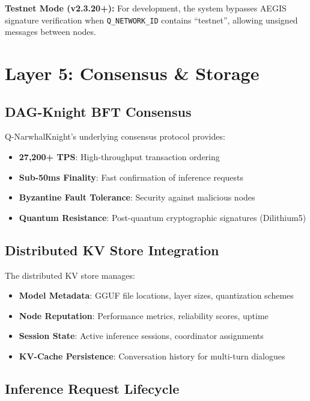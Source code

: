 \documentclass[11pt,a4paper]{article}
\begin{document}
\textbf{Testnet Mode (v2.3.20+):} For development, the system bypasses AEGIS signature verification when \texttt{Q\_NETWORK\_ID} contains ``testnet'', allowing unsigned messages between nodes.

\newpage
\section{Layer 5: Consensus \& Storage}

\subsection{DAG-Knight BFT Consensus}

Q-NarwhalKnight's underlying consensus protocol provides:
\begin{itemize}
    \item \textbf{27,200+ TPS}: High-throughput transaction ordering
    \item \textbf{Sub-50ms Finality}: Fast confirmation of inference requests
    \item \textbf{Byzantine Fault Tolerance}: Security against malicious nodes
    \item \textbf{Quantum Resistance}: Post-quantum cryptographic signatures (Dilithium5)
\end{itemize}

\subsection{Distributed KV Store Integration}

The distributed KV store manages:
\begin{itemize}
    \item \textbf{Model Metadata}: GGUF file locations, layer sizes, quantization schemes
    \item \textbf{Node Reputation}: Performance metrics, reliability scores, uptime
    \item \textbf{Session State}: Active inference sessions, coordinator assignments
    \item \textbf{KV-Cache Persistence}: Conversation history for multi-turn dialogues
\end{itemize}

\subsection{Inference Request Lifecycle}
\end{document}
